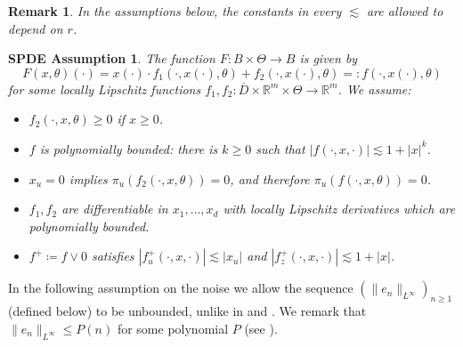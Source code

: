 \documentclass[final]{amsart}
\newtheorem{sass}{SPDE Assumption}[]
\newtheorem{rem}[thm]{Remark}
\numberwithin{thm}{section}
\numberwithin{equation}{section}
\newcommand{\R}{\mathbb{R}}
\begin{document}
\begin{rem}
    In the assumptions below, the constants in every $\lesssim$ are allowed to depend on $r$.
\end{rem}

\begin{sass}\label{SPDE-F}
    The function $F: B \times \Theta \to B$ is given by
    $$F(x,\theta)(\cdot) = x(\cdot)\cdot f_1(\cdot,x(\cdot),\theta) + f_2(\cdot,x(\cdot),\theta) =: f(\cdot,x(\cdot),\theta)$$
    for some locally Lipschitz functions $f_1,f_2: \overline D \times \R^m \times \Theta \to \R^m$. We assume:
    \begin{itemize}
        \item $f_2(\cdot,x,\theta) \geq 0$ if $x \geq 0$. 
        \item $f$ is polynomially bounded: there is $k \geq 0$ such that $|f(\cdot,x,\cdot)| \lesssim 1 + |x|^k$.
        \item $x_u = 0$ implies $\pi_u(f_2(\cdot, x, \theta)) = 0$, 
        and therefore $\pi_u(f(\cdot, x, \theta)) = 0$.
        
        \item $f_1,f_2$ are differentiable in $x_1,\dots,x_d$ with locally Lipschitz derivatives which are polynomially bounded.
        
        \item $f^+ \coloneqq f \vee 0$ satisfies $|f^+_u(\cdot,x,\cdot)| \lesssim |x_u|$ and $|f^+_z(\cdot,x,\cdot)| \lesssim 1 + |x|$.
    \end{itemize}
\end{sass}

In the following assumption on the noise we allow the sequence $(\|e_n\|_{L^\infty})_{n\geq 1}$ (defined below) to be unbounded, unlike in 
 \cite[Hypothesis 8.1]{stochastic-lotka-volterra-SPDE} and  \cite[Hypothesis 1-3]{Cerrai2003}. 
 We remark that $\|e_n\|_{L^\infty} \leq P(n)$ for some polynomial $P$ (see \cite[Remark 2.2]{Cerrai2003}).
\end{document}
